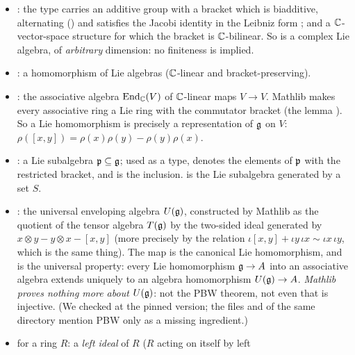 \begin{itemize}
\item \lean{[LieRing 𝔤] [LieAlgebra ℂ 𝔤]}: the type  carries an additive group with a
  bracket  which is biadditive, alternating () and satisfies the
  Jacobi identity in the Leibniz form ; and a
  ${\mathbb{C}}$-vector-space structure for which the bracket is ${\mathbb{C}}$-bilinear. So  is a complex Lie
  algebra, of \emph{arbitrary} dimension: no finiteness is implied.
\item {}: a homomorphism of Lie algebras (${\mathbb{C}}$-linear and bracket-preserving).
\item {}: the associative algebra $\operatorname{End}_{\mathbb{C}}(V)$ of ${\mathbb{C}}$-linear maps $V\to V$.
  Mathlib makes every associative ring a Lie ring with the commutator bracket
   (the lemma \allowbreak{}\allowbreak{}\allowbreak{}\allowbreak{}). So a Lie
  homomorphism  is precisely a representation of $\mathfrak{g}$ on $V$:
  $\rho([x,y]) = \rho(x)\rho(y)-\rho(y)\rho(x)$.
\item {}: a Lie subalgebra $\mathfrak{p}\subseteq\mathfrak{g}$; used as a type, 
  denotes the elements of $\mathfrak{p}$ with the restricted bracket, and  is the inclusion.
   is the Lie subalgebra generated by a set $S$.
\item {}: the universal enveloping algebra $U(\mathfrak{g})$,
  constructed by Mathlib as the quotient of the tensor algebra $T(\mathfrak{g})$ by the two-sided ideal
  generated by $x\otimes y - y\otimes x - [x,y]$ (more precisely by the relation
  $\iota[x,y] + \iota y\,\iota x \sim \iota x\,\iota y$, which is the same thing). The map
   is the canonical Lie homomorphism, and
   is the universal property: every Lie homomorphism $\mathfrak{g}\to A$ into an associative
  algebra extends uniquely to an algebra homomorphism $U(\mathfrak{g})\to A$. \emph{Mathlib proves
  nothing more about $U(\mathfrak{g})$}: not the PBW theorem, not even that  is injective. (We
  checked  at the pinned
  version; the files  and  of the same directory
  mention PBW only as a missing ingredient.)
\item {} for a ring $R$: a \emph{left ideal} of $R$ ($R$ acting on itself by left

\end{itemize}
